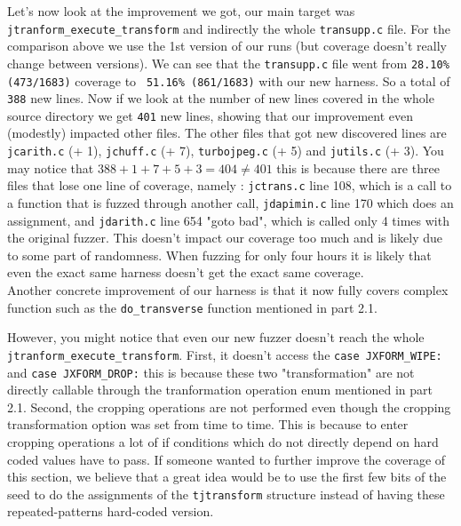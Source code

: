 \documentclass[12pt]{article}
\begin{document}
\noindent Let's now look at the improvement we got, our main target was \texttt{jtranform\_execute\_transform} and indirectly the whole \texttt{transupp.c} file. For the comparison above we use the 1st version of our runs (but coverage doesn't really change between versions). We can see that the \texttt{transupp.c} file went from \texttt{28.10\% (473/1683)} coverage to \texttt{ 51.16\% (861/1683)} with our new harness. So a total of \texttt{388} new lines. Now if we look at the number of new lines covered in the whole source directory we get \texttt{401} new lines, showing that our improvement even (modestly) impacted other files. The other files that got new discovered lines are \texttt{jcarith.c} (+ 1), \texttt{jchuff.c} (+ 7), \texttt{turbojpeg.c} (+ 5) and \texttt{jutils.c} (+ 3). You may notice that $388 + 1 + 7 + 5 + 3 = 404 \neq 401$ this is because there are three files that lose one line of coverage, namely : \texttt{jctrans.c} line 108, which is a call to a function that is fuzzed through another call, \texttt{jdapimin.c} line 170 which does an assignment, and \texttt{jdarith.c} line 654 "goto bad", which is called only 4 times with the original fuzzer. This doesn't impact our coverage too much and is likely due to some part of randomness. When fuzzing for only four hours it is likely that even the exact same harness doesn't get the exact same coverage. \\

\noindent Another concrete improvement of our harness is that it now fully covers complex function such as the \texttt{do\_transverse} function mentioned in part 2.1.

\noindent However, you might notice that even our new fuzzer doesn't reach the whole \texttt{jtranform\_execute\_transform}. First, it doesn't access the \texttt{case JXFORM\_WIPE:} and \texttt{case JXFORM\_DROP:} this is because these two "transformation" are not directly callable through the tranformation operation enum mentioned in part 2.1. Second, the cropping operations are not performed even though the cropping transformation option was set from time to time. This is because to enter cropping operations a lot of if conditions which do not directly depend on hard coded values have to pass. If someone wanted to further improve the coverage of this section, we believe that a great idea would be to use the first few bits of the seed to do the assignments of the \texttt{tjtransform} structure instead of having these repeated-patterns hard-coded version. 
\end{document}
